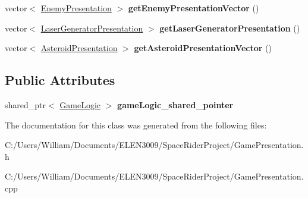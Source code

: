 \begin{DoxyCompactItemize}
vector$<$ \hyperlink{class_enemy_presentation}{Enemy\+Presentation} $>$ {\bfseries get\+Enemy\+Presentation\+Vector} ()
\item 
\mbox{\label{class_game_presentation_a6da88c7baf912bccf09f274b6a5ae7b6}} 
vector$<$ \hyperlink{class_laser_generator_presentation}{Laser\+Generator\+Presentation} $>$ {\bfseries get\+Laser\+Generator\+Presentation} ()
\item 
\mbox{\label{class_game_presentation_a28a7d4fb65413d6a10b960721aaca0d2}} 
vector$<$ \hyperlink{class_asteroid_presentation}{Asteroid\+Presentation} $>$ {\bfseries get\+Asteroid\+Presentation\+Vector} ()
\end{DoxyCompactItemize}
\subsection*{Public Attributes}
\begin{DoxyCompactItemize}
\item 
\mbox{\label{class_game_presentation_a2f149f73bdd87ded8a6d66ecc427352f}} 
shared\+\_\+ptr$<$ \hyperlink{class_game_logic}{Game\+Logic} $>$ {\bfseries game\+Logic\+\_\+shared\+\_\+pointer}
\end{DoxyCompactItemize}


The documentation for this class was generated from the following files\+:\begin{DoxyCompactItemize}
\item 
C\+:/\+Users/\+William/\+Documents/\+E\+L\+E\+N3009/\+Space\+Rider\+Project/Game\+Presentation.\+h\item 
C\+:/\+Users/\+William/\+Documents/\+E\+L\+E\+N3009/\+Space\+Rider\+Project/Game\+Presentation.\+cpp\end{DoxyCompactItemize}
